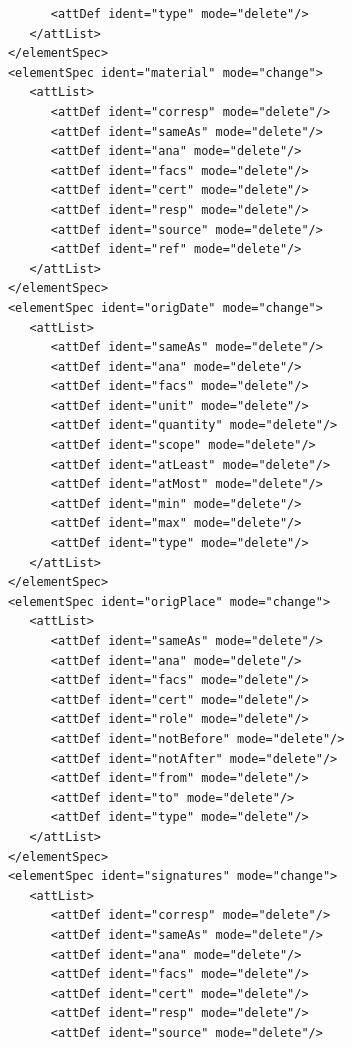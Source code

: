 \documentclass[a4paper,12pt,twoside]{book}
\begin{document}
\begin{verbatim}
                  <attDef ident="type" mode="delete"/>
               </attList>
            </elementSpec>
            <elementSpec ident="material" mode="change">
               <attList>
                  <attDef ident="corresp" mode="delete"/>
                  <attDef ident="sameAs" mode="delete"/>
                  <attDef ident="ana" mode="delete"/>
                  <attDef ident="facs" mode="delete"/>
                  <attDef ident="cert" mode="delete"/>
                  <attDef ident="resp" mode="delete"/>
                  <attDef ident="source" mode="delete"/>
                  <attDef ident="ref" mode="delete"/>
               </attList>
            </elementSpec>
            <elementSpec ident="origDate" mode="change">
               <attList>
                  <attDef ident="sameAs" mode="delete"/>
                  <attDef ident="ana" mode="delete"/>
                  <attDef ident="facs" mode="delete"/>
                  <attDef ident="unit" mode="delete"/>
                  <attDef ident="quantity" mode="delete"/>
                  <attDef ident="scope" mode="delete"/>
                  <attDef ident="atLeast" mode="delete"/>
                  <attDef ident="atMost" mode="delete"/>
                  <attDef ident="min" mode="delete"/>
                  <attDef ident="max" mode="delete"/>
                  <attDef ident="type" mode="delete"/>
               </attList>
            </elementSpec>
            <elementSpec ident="origPlace" mode="change">
               <attList>
                  <attDef ident="sameAs" mode="delete"/>
                  <attDef ident="ana" mode="delete"/>
                  <attDef ident="facs" mode="delete"/>
                  <attDef ident="cert" mode="delete"/>
                  <attDef ident="role" mode="delete"/>
                  <attDef ident="notBefore" mode="delete"/>
                  <attDef ident="notAfter" mode="delete"/>
                  <attDef ident="from" mode="delete"/>
                  <attDef ident="to" mode="delete"/>
                  <attDef ident="type" mode="delete"/>
               </attList>
            </elementSpec>
            <elementSpec ident="signatures" mode="change">
               <attList>
                  <attDef ident="corresp" mode="delete"/>
                  <attDef ident="sameAs" mode="delete"/>
                  <attDef ident="ana" mode="delete"/>
                  <attDef ident="facs" mode="delete"/>
                  <attDef ident="cert" mode="delete"/>
                  <attDef ident="resp" mode="delete"/>
                  <attDef ident="source" mode="delete"/>

\end{verbatim}
\end{document}
